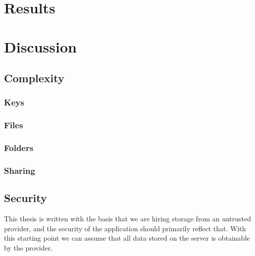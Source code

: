 \documentclass[pdftex,english,10pt,b5paper,twoside]{book}
\begin{document}
\chapter{Results}

\chapter{Discussion}
\section{Complexity}

\subsection{Keys}

\subsection{Files}

\subsection{Folders}

\subsection{Sharing}

\section{Security}
This thesis is written with the basis that we are hiring storage from an
untrusted provider, and the security of the application should primarily
reflect that. With this starting point we can assume that all data stored on
the server is obtainable by the provider.
\end{document}
